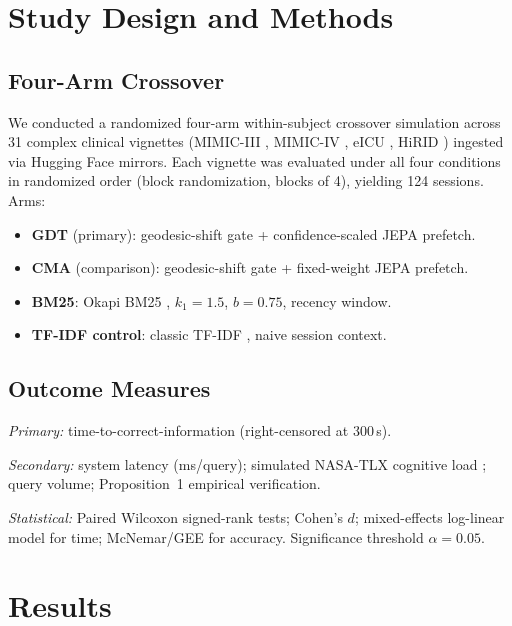 \documentclass[11pt,a4paper]{article}
\begin{document}
\section{Study Design and Methods}
\label{sec:methods}

\subsection{Four-Arm Crossover}

We conducted a randomized four-arm within-subject crossover simulation across 31 complex clinical vignettes (MIMIC-III \cite{johnson2016_mimic3}, MIMIC-IV \cite{pollard2018_mimic4}, eICU \cite{pollard2018_eicu}, HiRID \cite{muller2021_hirid}) ingested via Hugging Face mirrors. Each vignette was evaluated under all four conditions in randomized order (block randomization, blocks of 4), yielding 124 sessions. Arms:
\begin{itemize}
  \item \textbf{GDT} (primary): geodesic-shift gate + confidence-scaled JEPA prefetch.
  \item \textbf{CMA} (comparison): geodesic-shift gate + fixed-weight JEPA prefetch.
  \item \textbf{BM25}: Okapi BM25 \cite{robertson1995}, $k_1{=}1.5$, $b{=}0.75$, recency window.
  \item \textbf{TF-IDF control}: classic TF-IDF \cite{salton83}, naive session context.
\end{itemize}

\subsection{Outcome Measures}

\textit{Primary:} time-to-correct-information (right-censored at 300\,s).

\textit{Secondary:} system latency (ms/query); simulated NASA-TLX cognitive load \cite{hart1988}; query volume; Proposition~1 empirical verification.

\textit{Statistical:} Paired Wilcoxon signed-rank tests; Cohen's $d$; mixed-effects log-linear model for time; McNemar/GEE for accuracy. Significance threshold $\alpha{=}0.05$.

\section{Results}
\label{sec:results}
\end{document}

